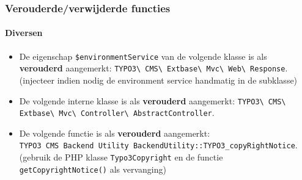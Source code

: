 \begin{frame}[fragile]
	\frametitle{Verouderde/verwijderde functies}
	\framesubtitle{Diversen}

	\lstset{basicstyle=\tiny\ttfamily}

	\begin{itemize}

		\item De eigenschap \texttt{\$environmentService} van de volgende klasse is als \textbf{verouderd} aangemerkt:
			\texttt{TYPO3\textbackslash
				CMS\textbackslash
				Extbase\textbackslash
				Mvc\textbackslash
				Web\textbackslash
				Response}.\newline
			\smaller
				(injecteer indien nodig de environment service handmatig in de subklasse)
			\normalsize

		\item De volgende interne klasse is als \textbf{verouderd} aangemerkt:\newline
			\texttt{TYPO3\textbackslash
				CMS\textbackslash
				Extbase\textbackslash
				Mvc\textbackslash
				Controller\textbackslash
				AbstractController}.

		\item De volgende functie is als \textbf{verouderd} aangemerkt:\newline
			\texttt{TYPO3\
				CMS\
				Backend\
				Utility\
				BackendUtility::TYPO3\_copyRightNotice}.\newline
				\smaller
					(gebruik de PHP klasse \texttt{Typo3Copyright} en de functie \texttt{getCopyrightNotice()} als vervanging)
				\normalsize

	\end{itemize}

\end{frame}


